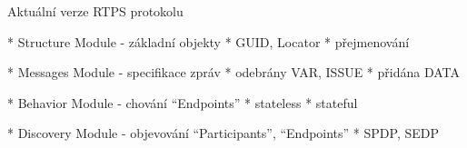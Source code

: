 \sec Aktuální verze RTPS protokolu

* Structure Module - základní objekty
\begitems
* GUID, Locator
* přejmenování
\enditems

* Messages Module - specifikace zpráv
\begitems
* odebrány VAR, ISSUE
* přidána DATA
\enditems

* Behavior Module - chování ``Endpoints''
\begitems
* stateless
* stateful
\enditems

* Discovery Module - objevování ``Participants'', ``Endpoints''
\begitems
* SPDP, SEDP
\enditems

